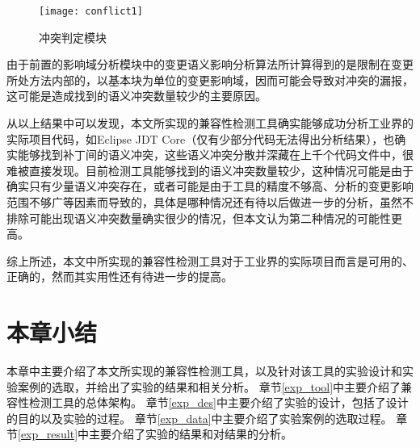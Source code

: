 \begin{figure}[H]
	\centering
	\texttt{[image: conflict1]}
	\caption {冲突判定模块}
	\label {conflict_data}	
\end{figure}


%

由于前置的影响域分析模块中的变更语义影响分析算法所计算得到的是限制在变更所处方法内部的，以基本块为单位的变更影响域，因而可能会导致对冲突的漏报，这可能是造成找到的语义冲突数量较少的主要原因。

从以上结果中可以发现，本文所实现的兼容性检测工具确实能够成功分析工业界的实际项目代码，如Eclipse JDT Core（仅有少部分代码无法得出分析结果），也确实能够找到补丁间的语义冲突，这些语义冲突分散并深藏在上千个代码文件中，很难被直接发现。目前检测工具能够找到的语义冲突数量较少，这种情况可能是由于确实只有少量语义冲突存在，或者可能是由于工具的精度不够高、分析的变更影响范围不够广等因素而导致的，具体是哪种情况还有待以后做进一步的分析，虽然不排除可能出现语义冲突数量确实很少的情况，但本文认为第二种情况的可能性更高。
%		

综上所述，本文中所实现的兼容性检测工具对于工业界的实际项目而言是可用的、正确的，然而其实用性还有待进一步的提高。

\section{本章小结}
本章中主要介绍了本文所实现的兼容性检测工具，以及针对该工具的实验设计和实验案例的选取，并给出了实验的结果和相关分析。
章节\ref {exp_tool}中主要介绍了兼容性检测工具的总体架构。
章节\ref {exp_des}中主要介绍了实验的设计，包括了设计的目的以及实验的过程。
章节\ref {exp_data}中主要介绍了实验案例的选取过程。
章节\ref {exp_result}中主要介绍了实验的结果和对结果的分析。